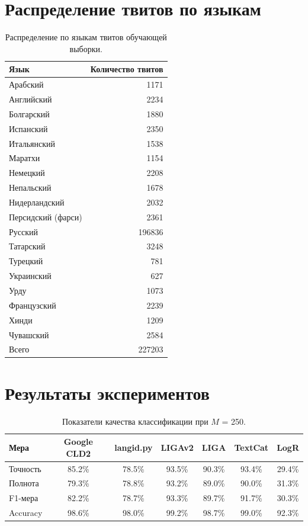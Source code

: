 \documentclass[a4paper, 14pt]{article}
\begin{document}
\section{Распределение твитов по языкам}
				\begin{center}
			\begin{table}[h]
			\begin{tabular*}{\textwidth}{|@{\extracolsep{\fill} }l  r|}
				\hline
				Язык  & Количество твитов \\
				\hline
				Арабский & 1171 \\
				Английский & 2234 \\
				Болгарский & 1880 \\
				Испанский & 2350 \\
				Итальянский & 1538 \\
				Маратхи & 1154 \\
				Немецкий & 2208 \\
				Непальский & 1678 \\
				Нидерландский & 2032 \\
				Персидский (фарси) & 2361 \\
				Русский & 196836 \\
				Татарский & 3248 \\
				Турецкий & 781 \\
				Украинский & 627 \\
				Урду & 1073 \\
				Французский & 2239 \\
				Хинди & 1209 \\
				Чувашский & 2584 \\
				\hline
				Всего & 227203 \\
				\hline
			\end{tabular*}
			\caption{Распределение по языкам твитов обучающей выборки.}
			\label{table:lang}
			\end{table}
			\end{center}	
\pagebreak
\section{Результаты экспериментов}
\begin{center}
\begin{table}[h]
\begin{tabular*}{0.954\textwidth}{| l| *{6}{|c} |}
\hline 
Мера & Google CLD2 & langid.py & LIGAv2 & LIGA & TextCat  & LogR\\
\hline
Точность & 85.2\% & 78.5\% & 93.5\% & 90.3\% & 93.4\% & 29.4\%\\
Полнота & 79.3\% & 78.8\% & 93.2\% & 89.0\% & 90.0\% & 31.3\%\\
F1-мера & 82.2\% & 78.7\% & 93.3\% & 89.7\% & 91.7\% & 30.3\%\\
Accuracy & 98.6\% & 98.0\% & 99.2\% & 98.7\% & 99.0\% & 92.3\%\\
\hline
\end{tabular*}
\caption{Показатели качества классификации при $M$ = 250.}
\label{table:250}
\end{table}
\end{center}
\end{document}
